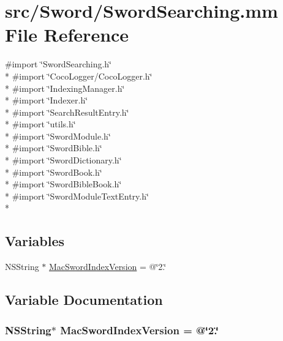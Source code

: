 \hypertarget{_sword_searching_8mm}{\section{src/\-Sword/\-Sword\-Searching.mm File Reference}
\label{_sword_searching_8mm}
}
{\ttfamily \#import \char`\"{}Sword\-Searching.\-h\char`\"{}}\\*
{\ttfamily \#import \char`\"{}Coco\-Logger/\-Coco\-Logger.\-h\char`\"{}}\\*
{\ttfamily \#import \char`\"{}Indexing\-Manager.\-h\char`\"{}}\\*
{\ttfamily \#import \char`\"{}Indexer.\-h\char`\"{}}\\*
{\ttfamily \#import \char`\"{}Search\-Result\-Entry.\-h\char`\"{}}\\*
{\ttfamily \#import \char`\"{}utils.\-h\char`\"{}}\\*
{\ttfamily \#import \char`\"{}Sword\-Module.\-h\char`\"{}}\\*
{\ttfamily \#import \char`\"{}Sword\-Bible.\-h\char`\"{}}\\*
{\ttfamily \#import \char`\"{}Sword\-Dictionary.\-h\char`\"{}}\\*
{\ttfamily \#import \char`\"{}Sword\-Book.\-h\char`\"{}}\\*
{\ttfamily \#import \char`\"{}Sword\-Bible\-Book.\-h\char`\"{}}\\*
{\ttfamily \#import \char`\"{}Sword\-Module\-Text\-Entry.\-h\char`\"{}}\\*
\subsection*{Variables}
\begin{DoxyCompactItemize}
\item 
N\-S\-String $\ast$ \hyperlink{_sword_searching_8mm_acc765f8fbddd706dafa2ba0bf710c964}{Mac\-Sword\-Index\-Version} = @\char`\"{}2.\char`\"{}
\end{DoxyCompactItemize}


\subsection{Variable Documentation}
\hypertarget{_sword_searching_8mm_acc765f8fbddd706dafa2ba0bf710c964}{
\subsubsection[{Mac\-Sword\-Index\-Version}]{\setlength{\rightskip}{0pt plus 5cm}N\-S\-String$\ast$ Mac\-Sword\-Index\-Version = @\char`\"{}2.\char`\"{}}}\label{_sword_searching_8mm_acc765f8fbddd706dafa2ba0bf710c964}
